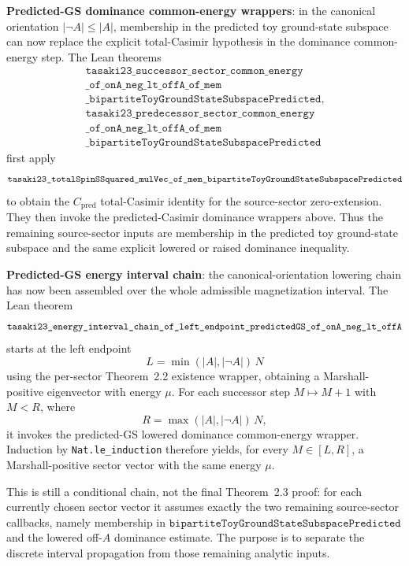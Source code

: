\documentclass[a4paper,11pt]{article}
\begin{document}
\textbf{Predicted-GS dominance common-energy wrappers}: in the
canonical orientation \(|\neg A|\le |A|\), membership in the predicted
toy ground-state subspace can now replace the explicit total-Casimir
hypothesis in the dominance common-energy step.  The Lean theorems
\[
\begin{gathered}
\texttt{tasaki23\_successor\_sector\_common\_energy}\\
\texttt{\_of\_onA\_neg\_lt\_offA\_of\_mem}\\
\texttt{\_bipartiteToyGroundStateSubspacePredicted},\\
\texttt{tasaki23\_predecessor\_sector\_common\_energy}\\
\texttt{\_of\_onA\_neg\_lt\_offA\_of\_mem}\\
\texttt{\_bipartiteToyGroundStateSubspacePredicted}
\end{gathered}
\]
first apply
\[
\texttt{tasaki23\_totalSpinSSquared\_mulVec\_of\_mem}\\
\texttt{\_bipartiteToyGroundStateSubspacePredicted}
\]
to obtain the \(C_{\mathrm{pred}}\) total-Casimir identity for the
source-sector zero-extension.  They then invoke the predicted-Casimir
dominance wrappers above.  Thus the remaining source-sector inputs are
membership in the predicted toy ground-state subspace and the same
explicit lowered or raised dominance inequality.

\textbf{Predicted-GS energy interval chain}: the canonical-orientation
lowering chain has now been assembled over the whole admissible
magnetization interval.  The Lean theorem
\[
\texttt{tasaki23\_energy\_interval\_chain\_of\_left\_endpoint}\\
\texttt{\_predictedGS\_of\_onA\_neg\_lt\_offA}
\]
starts at the left endpoint
\[
  L=\min(|A|,|\neg A|)\,N
\]
using the per-sector Theorem~2.2 existence wrapper, obtaining a
Marshall-positive eigenvector with energy \(\mu\).  For each
successor step \(M\mapsto M+1\) with \(M<R\), where
\[
  R=\max(|A|,|\neg A|)\,N,
\]
it invokes the predicted-GS lowered dominance common-energy wrapper.
Induction by \texttt{Nat.le\_induction} therefore yields, for every
\(M\in[L,R]\), a Marshall-positive sector vector with the same energy
\(\mu\).

This is still a conditional chain, not the final Theorem~2.3 proof:
for each currently chosen sector vector it assumes exactly the two
remaining source-sector callbacks, namely membership in
\(\texttt{bipartiteToyGroundStateSubspacePredicted}\) and the lowered
off-\(A\) dominance estimate.  The purpose is to separate the discrete
interval propagation from those remaining analytic inputs.
\end{document}
